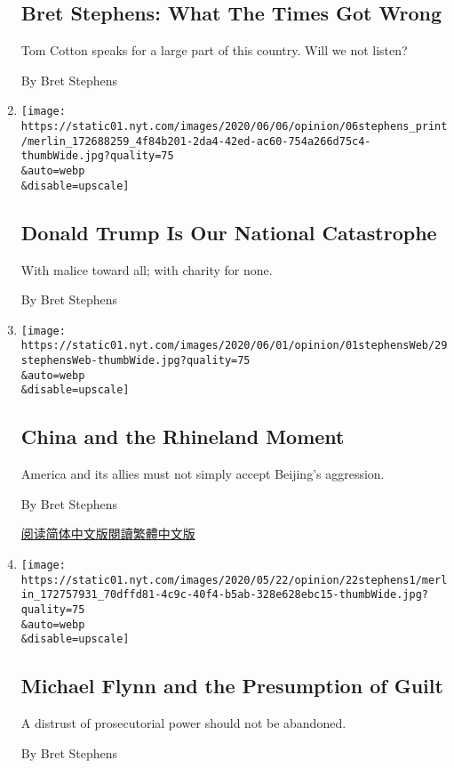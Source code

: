 \begin{enumerate}
  \hypertarget{bret-stephens-what-the-times-got-wrong}{%
  \subsection{Bret Stephens: What The Times Got
  Wrong}\label{bret-stephens-what-the-times-got-wrong}}

  Tom Cotton speaks for a large part of this country. Will we not
  listen?

  By Bret Stephens
\item
  \href{/2020/06/05/opinion/donald-trump.html}{}

  \texttt{[image: https://static01.nyt.com/images/2020/06/06/opinion/06stephens\_print/merlin\_172688259\_4f84b201-2da4-42ed-ac60-754a266d75c4-thumbWide.jpg?quality=75\\\&auto=webp\\\&disable=upscale]}

  \hypertarget{donald-trump-is-our-national-catastrophe}{%
  \subsection{Donald Trump Is Our National
  Catastrophe}\label{donald-trump-is-our-national-catastrophe}}

  With malice toward all; with charity for none.

  By Bret Stephens
\item
  \href{/2020/05/29/opinion/china-hong-kong.html}{}

  \texttt{[image: https://static01.nyt.com/images/2020/06/01/opinion/01stephensWeb/29stephensWeb-thumbWide.jpg?quality=75\\\&auto=webp\\\&disable=upscale]}

  \hypertarget{china-and-the-rhineland-moment}{%
  \subsection{China and the Rhineland
  Moment}\label{china-and-the-rhineland-moment}}

  America and its allies must not simply accept Beijing's aggression.

  By Bret Stephens

  \href{https://cn.nytimes.com/opinion/20200604/china-hong-kong/}{阅读简体中文版}\href{https://cn.nytimes.com/opinion/20200604/china-hong-kong/zh-hant/}{閱讀繁體中文版}
\item
  \href{/2020/05/22/opinion/michael-flynn-case-dropped.html}{}

  \texttt{[image: https://static01.nyt.com/images/2020/05/22/opinion/22stephens1/merlin\_172757931\_70dffd81-4c9c-40f4-b5ab-328e628ebc15-thumbWide.jpg?quality=75\\\&auto=webp\\\&disable=upscale]}

  \hypertarget{michael-flynn-and-the-presumption-of-guilt}{%
  \subsection{Michael Flynn and the Presumption of
  Guilt}\label{michael-flynn-and-the-presumption-of-guilt}}

  A distrust of prosecutorial power should not be abandoned.

  By Bret Stephens
\end{enumerate}

